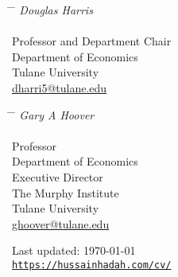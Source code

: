 \documentclass[letterpaper]{article}
\begin{document}
\noindent
\parbox[t]{0.32\textwidth}{ 
\begin{tabbing}
\hspace{2.75cm} \= \hspace{4cm} \= \kill
{\textit{Douglas Harris} } \\\\
Professor and Department Chair \\
Department of Economics \\
{Tulane University}\\ 
{\href{mailto:dharri5@tulane.edu}{dharri5@tulane.edu}}
\end{tabbing}}
\hspace{0.1\textwidth}
\parbox[t]{0.32\textwidth}{ 
\begin{tabbing}
\hspace{2.75cm} \= \hspace{4cm} \= \kill
{\textit{Gary A Hoover} } \\\\
Professor  \\
Department of Economics \\
Executive Director \\
The Murphy Institute \\
{Tulane University}\\ 
{\href{mailto:ghoover@tulane.edu}{ghoover@tulane.edu}}
\end{tabbing}}

\enlargethispage{-10mm}  %
\begin{center}
  \begin{footnotesize}
    Last updated: \today \\
    \href{https://hussainhadah.com/cv/}{\texttt{https://hussainhadah.com/cv/}}
  \end{footnotesize}
\end{center}
\end{document}
